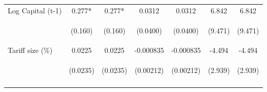 \documentclass{article}
\begin{document}
\begin{table}[htbp]
{\begin{tabular}{lcccccc}
Log Capital (t-1) & 0.277* & 0.277* & 0.0312 & 0.0312 & 6.842 & 6.842 \\
\vspace{4pt} & \begin{footnotesize}(0.160)\end{footnotesize} & \begin{footnotesize}(0.160)\end{footnotesize} & \begin{footnotesize}(0.0400)\end{footnotesize} & \begin{footnotesize}(0.0400)\end{footnotesize} & \begin{footnotesize}(9.471)\end{footnotesize} & \begin{footnotesize}(9.471)\end{footnotesize} \\
Tariff size (\%) & 0.0225 & 0.0225 & -0.000835 & -0.000835 & -4.494 & -4.494 \\
 & \begin{footnotesize}(0.0235)\end{footnotesize} & \begin{footnotesize}(0.0235)\end{footnotesize} & \begin{footnotesize}(0.00212)\end{footnotesize} & \begin{footnotesize}(0.00212)\end{footnotesize} & \begin{footnotesize}(2.939)\end{footnotesize} & \begin{footnotesize}(2.939)\end{footnotesize} \\
\vspace{4pt} & \begin{footnotesize}\end{footnotesize} & \begin{footnotesize}\end{footnotesize} & \begin{footnotesize}\end{footnotesize} & \begin{footnotesize}\end{footnotesize} & \begin{footnotesize}\end{footnotesize} & \begin{footnotesize}\end{footnotesize} \\ 

\end{tabular}}
\end{table}
\end{document}

